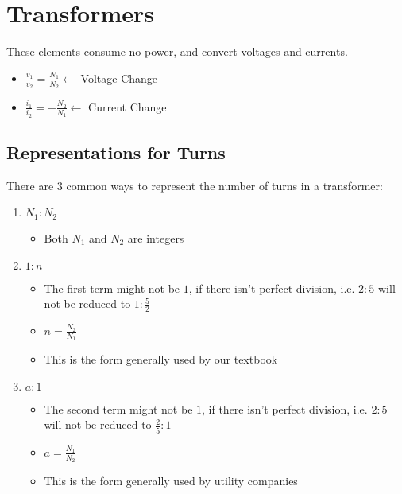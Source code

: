 \section*{Transformers} \label{sec:Transformers}
These elements consume no power, and convert voltages and currents.
\begin{itemize}[noitemsep, nolistsep]
	\item $\frac{v_{1}}{v_{2}} = \frac{N_{1}}{N_{2}} \longleftarrow$ Voltage Change
	\item $\frac{i_{1}}{i_{2}} = -\frac{N_{2}}{N_{1}} \longleftarrow$ Current Change
\end{itemize}
\vspace{-4.75mm}

	\subsection*{Representations for Turns} \label{subsec:Turn Representations}
		There are 3 common ways to represent the number of turns in a transformer:
		\begin{enumerate}
			\item $N_{1} : N_{2}$
			\begin{itemize}[noitemsep, nolistsep]
				\item Both $N_{1}$ and $N_{2}$ are integers
			\end{itemize}
			\item $1 : n$
			\begin{itemize}[noitemsep, nolistsep]
				\item The first term might not be $1$, if there isn't perfect division, i.e. $2 : 5$ will not be reduced to $1 : \frac{5}{2}$
				\item $n = \frac{N_{2}}{N_{1}}$
				\item This is the form generally used by our textbook
			\end{itemize}
			\item $a : 1$
			\begin{itemize}[noitemsep, nolistsep]
				\item The second term might not be $1$, if there isn't perfect division, i.e. $2 : 5$ will not be reduced to $\frac{2}{5} : 1$
				\item $a = \frac{N_{1}}{N_{2}}$
				\item This is the form generally used by utility companies
			\end{itemize}
		\end{enumerate}
		\vspace{-5mm}
		
